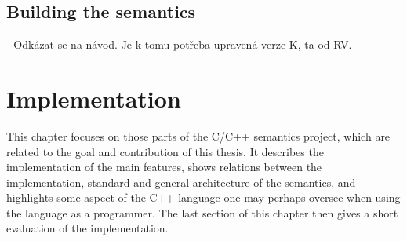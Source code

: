 \documentclass{fithesis3}
\begin{document}






\section{Building the semantics}
- Odkázat se na návod. Je k tomu potřeba upravená verze K, ta od RV.

\chapter{Implementation}

This chapter focuses on those parts of the C/C++ semantics project, which are related to the goal and contribution of this thesis. It describes the implementation of the main features, shows relations between the implementation, standard and general architecture of the semantics, and highlights some aspect of the C++ language one may perhaps oversee when using the language as a programmer. The last section of this chapter then gives a short evaluation of the implementation.

	

\end{document}

